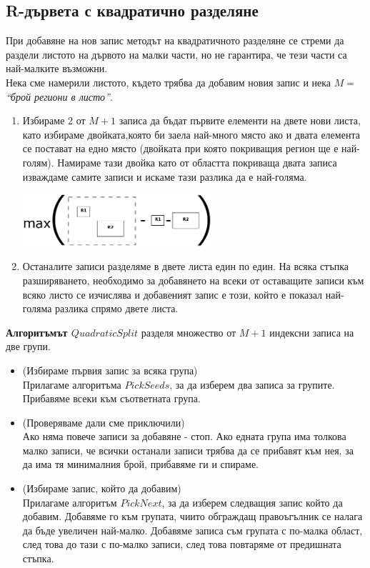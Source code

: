 \documentclass[a4paper,10pt]{article}
\begin{document}
\subsection{R-дървета с квадратично разделяне}
При добавяне на нов запис методът на квадратичното разделяне се стреми да раздели листото на дървото на малки части, 
но не гарантира, че тези части са най-малките възможни. \\
Нека сме намерили листото, където трябва да добавим новия запис и 
нека $M = $ \textit{``брой региони в листо''}.
\begin{enumerate}
\item Избираме 2 от $M+1$ записа да бъдат първите елементи на двете нови листа, като избираме двойката,която би заела
най-много място ако и двата елемента се постават на едно място (двойката при която покриващия регион ще е най-голям).
Намираме тази двойка като от областта покриваща двата записа изваждаме самите записи и искаме тази разлика да е най-голяма.
\begin{center}
\includegraphics[width=70mm]{Diagram1.png}\end{center}
\item Останалите записи разделяме в двете листа един по един.
На всяка стъпка разширяването, необходимо за добавянето на всеки от оставащите записи към всяко листо се изчислява
и добавеният запис е този, който е показал най-голяма разлика спрямо двете листа.
\end{enumerate}

\textbf{Алгоритъмът $Quadratic Split$} разделя множество от $M+1$ индексни записа на две групи.
\begin{itemize}
 \item (Избираме първия запис за всяка група) \\
Прилагаме алгоритъма $PickSeeds$, за да изберем два записа за групите. Прибавяме всеки към съответната група.
 \item (Проверяваме дали сме приключили) \\
Ако няма повече записи за добавяне - стоп. Ако едната група има толкова малко записи, че всички останали записи трябва да 
се прибавят към нея, за да има тя минималния брой, прибавяме ги и спираме.
 \item (Избираме запис, който да добавим) \\
Прилагаме алгоритъм $PickNext$,  за да изберем следващия запис който да добавим. Добавяме го към групата, чиито обграждащ 
правоъгълник се налага да бъде увеличен най-малко. Добавяме записа съм групата с по-малка област, 
след това до тази с по-малко записи, след това повтаряме от предишната стъпка.
\end{itemize}
\end{document}
